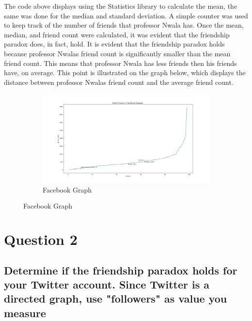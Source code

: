 \documentclass[11pt]{scrartcl} %
\begin{document}
\tabto{2.0cm} The code above displays using the Statistics library to calculate the mean, the same was done for the median and standard deviation. A simple counter was used to keep track of the number of friends that professor Nwala has. Once the mean, median, and friend count were calculated, it was evident that the friendship paradox does, in fact, hold. 
\newline \newline
\tabto{2.0cm} It is evident that the friendship paradox holds because professor Nwalas friend count is significantly smaller than the mean friend count. This means that professor Nwala has less friends then his friends have, on average. This point is illustrated on the graph below, which displays the distance between professor Nwalas friend count and the average friend count.
\begin{figure}[h!]
\begin{center}
\begin{subfigure}[b]{1.1\linewidth }
    \includegraphics[width=\linewidth]{../Figures/FacebookGraph.png}
    \caption{Facebook Graph}
\end{subfigure}
\end{center}
\end{figure}

\pagebreak

\section*{Question 2}


\subsection*{Determine if the friendship paradox holds for your Twitter account.
Since Twitter is a directed graph, use "followers" as value you measure}
\end{document}
